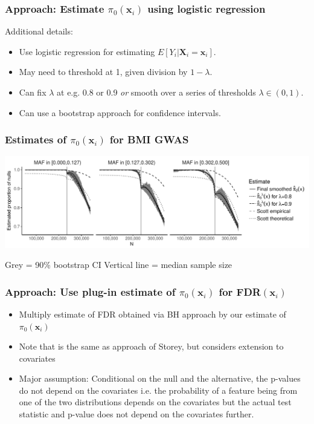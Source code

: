 \documentclass{beamer}
\newcommand{\bX}{\mathbf{X}}
\newcommand{\bx}{\mathbf{x}}
\begin{document}

\begin{frame}
\frametitle{Approach: Estimate $\pi_0(\bx_i)$ using logistic regression}

Additional details:

\begin{itemize}
\item Use logistic regression for estimating $E[Y_i|\bX_i=\bx_i]$.
\item May need to threshold at 1, given division by $1-\lambda$.
\item Can fix $\lambda$ at e.g. 0.8 or 0.9 \textit{or} smooth over a series of thresholds $\lambda \in (0,1)$.
\item Can use a bootstrap approach for confidence intervals.
\end{itemize}

\end{frame}


\begin{frame}
\frametitle{Estimates of $\pi_0(\bx_i)$ for BMI GWAS}

\begin{center}
\includegraphics[scale=0.48]{Fig2-1.pdf} 
\end{center}

Grey = 90\% bootstrap CI
Vertical line = median sample size

\end{frame}


\begin{frame}
\frametitle{Approach: Use plug-in estimate of $\pi_0(\bx_i)$ for FDR$(\bx_i)$}

\begin{itemize}
\item Multiply estimate of FDR obtained via BH approach by our estimate of $\pi_0(\bx_i)$

\item Note that is the same as approach of Storey, but considers extension to covariates

\item Major assumption: Conditional on the null and the alternative, the p-values do not depend on the covariates
i.e. the probability of a feature being from one of the two distributions depends on the covariates but the actual test statistic and p-value
does not depend on the covariates further.
\end{itemize}

\end{frame}
\end{document}
